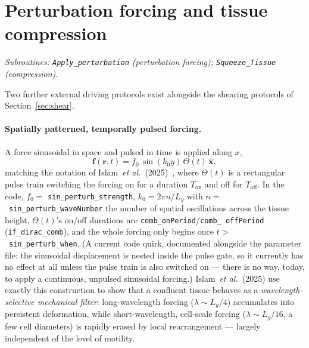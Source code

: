 \documentclass[11pt]{article}
\newcommand{\rvec}{\mathbf{r}}
\begin{document}
\section{Perturbation forcing and tissue compression}
\label{sec:perturbation}

\textit{Subroutines: \texttt{Apply\_perturbation} (perturbation forcing);
\texttt{Squeeze\_\allowbreak Tissue} (compression).}

Two further external driving protocols exist alongside the shearing protocols of
Section~\ref{sec:shear}.

\paragraph{Spatially patterned, temporally pulsed forcing.} A force sinusoidal in
space and pulsed in time is applied along $x$,
\begin{equation}
  \mathbf f(\rvec,t) = f_0\,\sin(k_0 y)\,\Theta(t)\,\hat{\mathbf x},
  \label{eq:sin-perturb}
\end{equation}
matching the notation of Islam~\emph{et al.}~(2025)~\cite{islam2025}, where
$\Theta(t)$ is a rectangular pulse train switching the forcing on for a duration
$T_{\mathrm{on}}$ and off for $T_{\mathrm{off}}$. In the code, $f_0 =$
\texttt{sin\_\allowbreak perturb\_\allowbreak strength}, $k_0 = 2\pi n/L_y$ with
$n=$~\texttt{sin\_\allowbreak perturb\_\allowbreak wave\allowbreak Number} the number of
spatial oscillations across the tissue height, $\Theta(t)$'s on/off durations are
\texttt{comb\_\allowbreak on\allowbreak Period}/\texttt{comb\_\allowbreak
off\allowbreak Period} (\texttt{if\_dirac\_comb}), and the whole forcing only begins
once $t>$~\texttt{sin\_\allowbreak perturb\_\allowbreak when}. (A current code quirk,
documented alongside the parameter file: the sinusoidal displacement is nested inside
the pulse gate, so it currently has no effect at all unless the pulse train is also
switched on --- there is no way, today, to apply a continuous, unpulsed sinusoidal
forcing.) Islam~\emph{et al.}~(2025) use exactly this construction to show that a
confluent tissue behaves as a \emph{wavelength-selective mechanical filter}:
long-wavelength forcing ($\lambda \sim L_y/4$) accumulates into persistent
deformation, while short-wavelength, cell-scale forcing ($\lambda \sim L_y/16$, a few
cell diameters) is rapidly erased by local rearrangement --- largely independent of
the level of motility.
\end{document}
